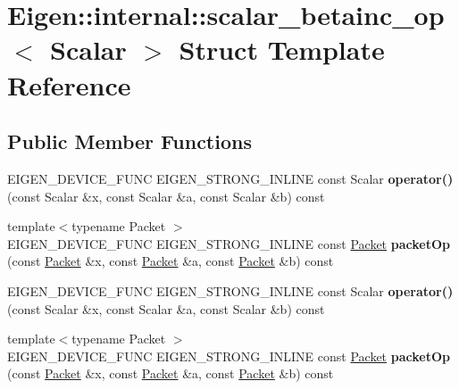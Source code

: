 \hypertarget{struct_eigen_1_1internal_1_1scalar__betainc__op}{}\section{Eigen\+:\+:internal\+:\+:scalar\+\_\+betainc\+\_\+op$<$ Scalar $>$ Struct Template Reference}
\label{struct_eigen_1_1internal_1_1scalar__betainc__op}
\subsection*{Public Member Functions}
\begin{DoxyCompactItemize}
\item 
\mbox{\label{struct_eigen_1_1internal_1_1scalar__betainc__op_a8dc1443d82f4be012c63b3beedd7990a}} 
E\+I\+G\+E\+N\+\_\+\+D\+E\+V\+I\+C\+E\+\_\+\+F\+U\+NC E\+I\+G\+E\+N\+\_\+\+S\+T\+R\+O\+N\+G\+\_\+\+I\+N\+L\+I\+NE const Scalar {\bfseries operator()} (const Scalar \&x, const Scalar \&a, const Scalar \&b) const
\item 
\mbox{\label{struct_eigen_1_1internal_1_1scalar__betainc__op_ade233d685c2337ba77581a4ead8fdcaa}} 
{\footnotesize template$<$typename Packet $>$ }\\E\+I\+G\+E\+N\+\_\+\+D\+E\+V\+I\+C\+E\+\_\+\+F\+U\+NC E\+I\+G\+E\+N\+\_\+\+S\+T\+R\+O\+N\+G\+\_\+\+I\+N\+L\+I\+NE const \hyperlink{union_eigen_1_1internal_1_1_packet}{Packet} {\bfseries packet\+Op} (const \hyperlink{union_eigen_1_1internal_1_1_packet}{Packet} \&x, const \hyperlink{union_eigen_1_1internal_1_1_packet}{Packet} \&a, const \hyperlink{union_eigen_1_1internal_1_1_packet}{Packet} \&b) const
\item 
\mbox{\label{struct_eigen_1_1internal_1_1scalar__betainc__op_a8dc1443d82f4be012c63b3beedd7990a}} 
E\+I\+G\+E\+N\+\_\+\+D\+E\+V\+I\+C\+E\+\_\+\+F\+U\+NC E\+I\+G\+E\+N\+\_\+\+S\+T\+R\+O\+N\+G\+\_\+\+I\+N\+L\+I\+NE const Scalar {\bfseries operator()} (const Scalar \&x, const Scalar \&a, const Scalar \&b) const
\item 
\mbox{\label{struct_eigen_1_1internal_1_1scalar__betainc__op_ade233d685c2337ba77581a4ead8fdcaa}} 
{\footnotesize template$<$typename Packet $>$ }\\E\+I\+G\+E\+N\+\_\+\+D\+E\+V\+I\+C\+E\+\_\+\+F\+U\+NC E\+I\+G\+E\+N\+\_\+\+S\+T\+R\+O\+N\+G\+\_\+\+I\+N\+L\+I\+NE const \hyperlink{union_eigen_1_1internal_1_1_packet}{Packet} {\bfseries packet\+Op} (const \hyperlink{union_eigen_1_1internal_1_1_packet}{Packet} \&x, const \hyperlink{union_eigen_1_1internal_1_1_packet}{Packet} \&a, const \hyperlink{union_eigen_1_1internal_1_1_packet}{Packet} \&b) const
\end{DoxyCompactItemize}


